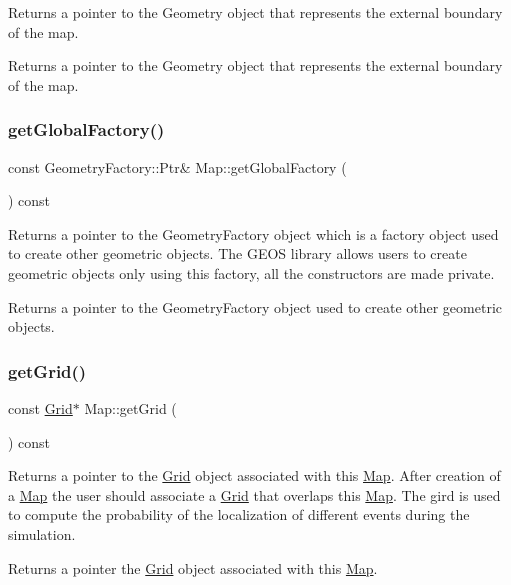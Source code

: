 Returns a pointer to the Geometry object that represents the external boundary of the map. \begin{DoxyReturn}{Returns}
a pointer to the Geometry object that represents the external boundary of the map. 
\end{DoxyReturn}
\mbox{\label{class_map_a69bd639b05daa393b051c76f0dc4af7c}} 
\subsubsection{\texorpdfstring{getGlobalFactory()}{getGlobalFactory()}}
{\footnotesize\ttfamily const Geometry\+Factory\+::\+Ptr\& Map\+::get\+Global\+Factory (\begin{DoxyParamCaption}{ }\end{DoxyParamCaption}) const}

Returns a pointer to the Geometry\+Factory object which is a factory object used to create other geometric objects. The G\+E\+OS library allows users to create geometric objects only using this factory, all the constructors are made private. \begin{DoxyReturn}{Returns}
a pointer to the Geometry\+Factory object used to create other geometric objects. 
\end{DoxyReturn}
\mbox{\label{class_map_aa9bf1c29b844f3b7fbf7a3153c24fef0}} 
\subsubsection{\texorpdfstring{getGrid()}{getGrid()}}
{\footnotesize\ttfamily const \mbox{\hyperlink{class_grid}{Grid}}$\ast$ Map\+::get\+Grid (\begin{DoxyParamCaption}{ }\end{DoxyParamCaption}) const}

Returns a pointer to the \mbox{\hyperlink{class_grid}{Grid}} object associated with this \mbox{\hyperlink{class_map}{Map}}. After creation of a \mbox{\hyperlink{class_map}{Map}} the user should associate a \mbox{\hyperlink{class_grid}{Grid}} that overlaps this \mbox{\hyperlink{class_map}{Map}}. The gird is used to compute the probability of the localization of different events during the simulation. \begin{DoxyReturn}{Returns}
a pointer the \mbox{\hyperlink{class_grid}{Grid}} object associated with this \mbox{\hyperlink{class_map}{Map}}. 
\end{DoxyReturn}
\mbox{\label{class_map_acede2ccba9bf0f987f3dde8c332bec17}} 
